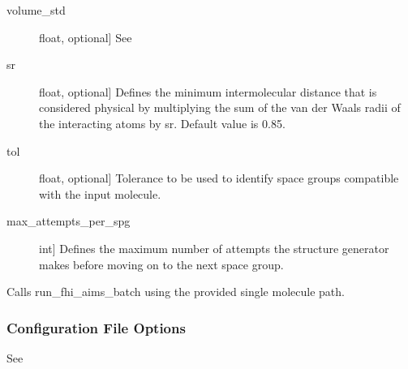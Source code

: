 \documentclass[letterpaper,10pt,english]{sphinxmanual}
\begin{document}
\begin{fulllineitems}
\begin{fulllineitems}
\begin{description}
\item[{volume\_std}] \leavevmode{[}float, optional{]}
See {\hyperref[\detokenize{index:Genarris.genarris_master.Genarris.Estimate_Unit_Cell_Volume}]{}}

\item[{sr}] \leavevmode{[}float, optional{]}
Defines the minimum intermolecular distance that is considered
physical by multiplying the sum of the van der Waals radii of the
interacting atoms by sr. Default value is 0.85.

\item[{tol}] \leavevmode{[}float, optional{]}
Tolerance to be used to identify space groups compatible with the
input molecule.

\item[{max\_attempts\_per\_spg}] \leavevmode{[}int{]}
Defines the maximum number of attempts the structure generator
makes before moving on to the next space group.

\end{description}

\end{fulllineitems}


\begin{fulllineitems}
\label{\detokenize{index:Genarris.genarris_master.Genarris.Relax_Single_Molecule}}
Calls run\_fhi\_aims\_batch using the provided single molecule path.
\subsubsection*{Configuration File Options}

See {\hyperref[\detokenize{index:Genarris.genarris_master.Genarris.Run_FHI_Aims_Batch}]{}}

\end{fulllineitems}



\end{fulllineitems}
\end{document}
